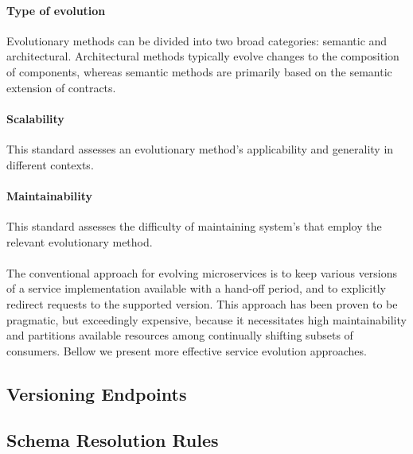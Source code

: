 \paragraph{Type of evolution}
Evolutionary methods can be divided into two broad categories: semantic and architectural.
Architectural methods typically evolve changes to the composition of components, whereas semantic methods are primarily based on the semantic extension of contracts.

\paragraph{Scalability}
This standard assesses an evolutionary method's applicability and generality in different contexts.

\paragraph{Maintainability}
This standard assesses the difficulty of maintaining system's that employ the relevant evolutionary method.

\paragraph{}

The conventional approach for evolving microservices is to keep various versions of a service implementation available with a hand-off period,
and to explicitly redirect requests to the supported version.
This approach has been proven to be pragmatic, but exceedingly expensive,
because it necessitates high maintainability and partitions available resources among continually shifting subsets of consumers.
Bellow we present more effective service evolution approaches.

\subsection{Versioning Endpoints} %
\label{sec:versioning_endpoints}

\subsection{Schema Resolution Rules} %
\label{sec:schema_resolution_rules}

